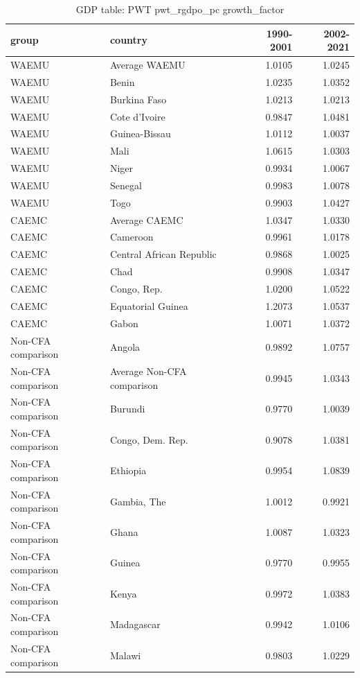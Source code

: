\begin{table}

\caption{GDP table: PWT pwt_rgdpo_pc growth_factor}
\centering
\begin{tabular}[t]{llrr}
\toprule
group & country & 1990-2001 & 2002-2021\\
\midrule
WAEMU & Average WAEMU & 1.0105 & 1.0245\\
WAEMU & Benin & 1.0235 & 1.0352\\
WAEMU & Burkina Faso & 1.0213 & 1.0213\\
WAEMU & Cote d'Ivoire & 0.9847 & 1.0481\\
WAEMU & Guinea-Bissau & 1.0112 & 1.0037\\
\addlinespace
WAEMU & Mali & 1.0615 & 1.0303\\
WAEMU & Niger & 0.9934 & 1.0067\\
WAEMU & Senegal & 0.9983 & 1.0078\\
WAEMU & Togo & 0.9903 & 1.0427\\
CAEMC & Average CAEMC & 1.0347 & 1.0330\\
\addlinespace
CAEMC & Cameroon & 0.9961 & 1.0178\\
CAEMC & Central African Republic & 0.9868 & 1.0025\\
CAEMC & Chad & 0.9908 & 1.0347\\
CAEMC & Congo, Rep. & 1.0200 & 1.0522\\
CAEMC & Equatorial Guinea & 1.2073 & 1.0537\\
\addlinespace
CAEMC & Gabon & 1.0071 & 1.0372\\
Non-CFA comparison & Angola & 0.9892 & 1.0757\\
Non-CFA comparison & Average Non-CFA comparison & 0.9945 & 1.0343\\
Non-CFA comparison & Burundi & 0.9770 & 1.0039\\
Non-CFA comparison & Congo, Dem. Rep. & 0.9078 & 1.0381\\
\addlinespace
Non-CFA comparison & Ethiopia & 0.9954 & 1.0839\\
Non-CFA comparison & Gambia, The & 1.0012 & 0.9921\\
Non-CFA comparison & Ghana & 1.0087 & 1.0323\\
Non-CFA comparison & Guinea & 0.9770 & 0.9955\\
Non-CFA comparison & Kenya & 0.9972 & 1.0383\\
\addlinespace
Non-CFA comparison & Madagascar & 0.9942 & 1.0106\\
Non-CFA comparison & Malawi & 0.9803 & 1.0229\\

\end{tabular}
\end{table}
